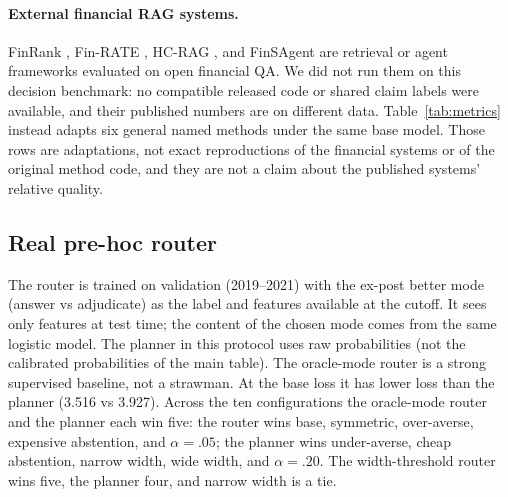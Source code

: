 \documentclass[11pt]{article}
\begin{document}
\paragraph{External financial RAG systems.}
FinRank \citep{mansouri2026finrank}, Fin-RATE \citep{jiang2026finrate},
HC-RAG \citep{chen2026hcrag}, and FinSAgent \citep{chi2026finsagent} are
retrieval or agent frameworks evaluated on open financial QA. We did not run
them on this decision benchmark: no compatible released code or shared claim
labels were available, and their published numbers are on different data.
Table~\ref{tab:metrics} instead adapts six general named methods under the same
base model. Those rows are adaptations, not exact reproductions of the
financial systems or of the original method code, and they are not a claim
about the published systems' relative quality.

\subsection{Real pre-hoc router}
\label{app:router}
The router is trained on validation (2019--2021) with the ex-post better mode
(answer vs adjudicate) as the label and features available at the cutoff. It
sees only features at test time; the content of the chosen mode comes from the
same logistic model. The planner in this protocol uses raw probabilities (not
the calibrated probabilities of the main table). The oracle-mode router is a
strong supervised baseline, not a strawman. At the base loss it has lower loss
than the planner (3.516 vs 3.927). Across the ten configurations the oracle-mode
router and the planner each win five: the router wins base, symmetric,
over-averse, expensive abstention, and $\alpha=.05$; the planner wins
under-averse, cheap abstention, narrow width, wide width, and $\alpha=.20$.
The width-threshold router wins five, the planner four, and narrow width is a
tie.
\end{document}
